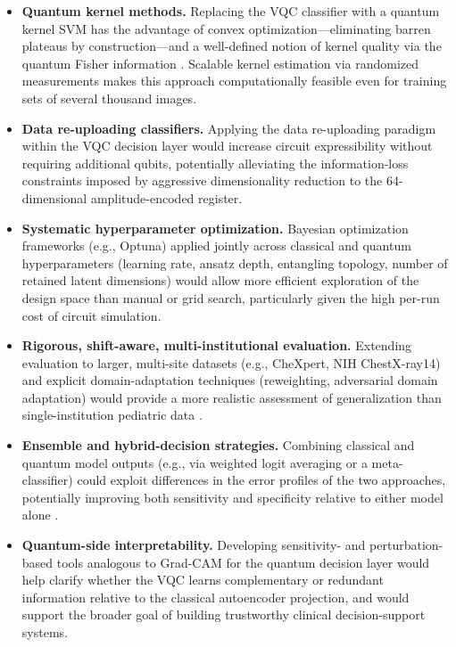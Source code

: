 \documentclass[11pt,a4paper]{article}
\begin{document}
\begin{itemize}[leftmargin=1.4em]
    ``quantum classifier head'' paradigm.  Their trainability guarantees
    \cite{pesah2021} and parameter independence from input size make them
    particularly attractive for deployment under NISQ constraints.
  \item \textbf{Quantum kernel methods.}  Replacing the VQC classifier with a
    quantum kernel SVM \cite{havlicek2019,schuld2019kernel} has the advantage
    of convex optimization---eliminating barren plateaus by construction---and
    a well-defined notion of kernel quality via the quantum Fisher information
    \cite{haug2021}.  Scalable kernel estimation via randomized measurements
    \cite{haug2021} makes this approach computationally feasible even for
    training sets of several thousand images.
  \item \textbf{Data re-uploading classifiers.}  Applying the
    data re-uploading paradigm \cite{perez2020} within the VQC decision layer
    would increase circuit expressibility without requiring additional qubits,
    potentially alleviating the information-loss constraints imposed by
    aggressive dimensionality reduction to the 64-dimensional amplitude-encoded
    register.
  \item \textbf{Systematic hyperparameter optimization.}  Bayesian optimization
    frameworks (e.g., Optuna) applied jointly across classical and quantum
    hyperparameters (learning rate, ansatz depth, entangling topology, number
    of retained latent dimensions) would allow more efficient exploration of the
    design space than manual or grid search, particularly given the high per-run
    cost of circuit simulation.
  \item \textbf{Rigorous, shift-aware, multi-institutional evaluation.}
    Extending evaluation to larger, multi-site datasets (e.g., CheXpert,
    NIH ChestX-ray14) and explicit domain-adaptation techniques (reweighting,
    adversarial domain adaptation) would provide a more realistic assessment
    of generalization than single-institution pediatric data \cite{zech2018}.
  \item \textbf{Ensemble and hybrid-decision strategies.}  Combining classical
    and quantum model outputs (e.g., via weighted logit averaging or a
    meta-classifier) could exploit differences in the error profiles of the two
    approaches, potentially improving both sensitivity and specificity relative
    to either model alone \cite{kundu2021}.
  \item \textbf{Quantum-side interpretability.}  Developing
    sensitivity- and perturbation-based tools analogous to Grad-CAM for the
    quantum decision layer would help clarify whether the VQC learns
    complementary or redundant information relative to the classical
    autoencoder projection, and would support the broader goal of building
    trustworthy clinical decision-support systems.
\end{itemize}
\end{document}

